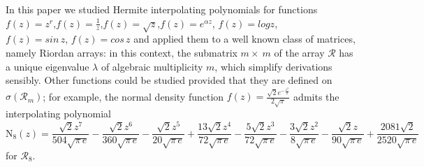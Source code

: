 
In this paper we studied Hermite interpolating polynomials for functions
$f(z)=z^{r}$,${f(z)=\frac{1}{z}}$,${f(z)=\sqrt{z}}$,${f(z)=e^{\alpha z}}$,
${f(z)=log{z}}$,\\\noindent ${f(z)=sin\,{z}}$, ${f(z)=cos\,{z}}$ and applied them to a well
known class of matrices, namely Riordan arrays: in this context, the submatrix
$m\times~m$ of the array $\mathcal{R}$ has a unique eigenvalue $\lambda$ of
algebraic multiplicity $m$, which simplify derivations sensibly.  Other
functions could be studied provided that they are defined on
$\sigma(\mathcal{R}_{m})$; for example, the normal density function
$\displaystyle f{\left (z \right )} = \frac{\sqrt{2} e^{- \frac{z^{2}}{2}}}{2
\sqrt{\pi}}$ admits the interpolating polynomial 
\begin{displaymath}
\operatorname{N_{ 8 }}{\left (z \right )} =
\frac{\sqrt{2} z^{7}}{504 \sqrt{\pi\,e} } - \frac{\sqrt{2}
z^{6}}{360 \sqrt{\pi\,e} } - \frac{\sqrt{2} z^{5}}{20 \sqrt{\pi\,e}
} + \frac{13 \sqrt{2} z^{4}}{72 \sqrt{\pi\,e} } -
\frac{5 \sqrt{2} z^{3}}{72 \sqrt{\pi\,e} } - \frac{3 \sqrt{2}
z^{2}}{8 \sqrt{\pi\,e} } - \frac{\sqrt{2} z}{90 \sqrt{\pi\,e}
} + \frac{2081 \sqrt{2}}{2520 \sqrt{\pi\,e} }
\end{displaymath}
for $\mathcal{R}_{8}$. 
    
